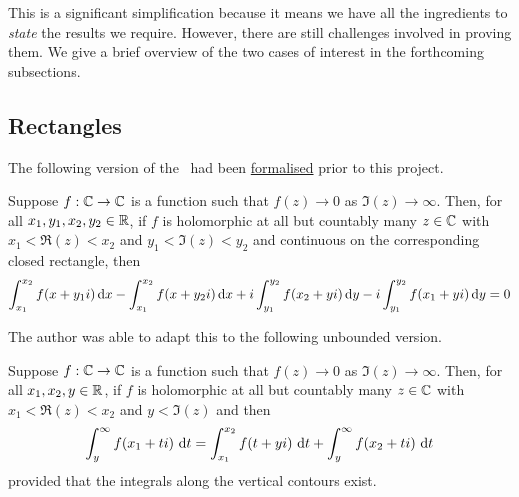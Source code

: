 This is a significant simplification because it means we have all the ingredients to \textit{state} the results we require. However, there are still challenges involved in proving them. We give a brief overview of the two cases of interest in the forthcoming subsections.

\subsection{Rectangles}

The following version of the \CGT\ had been \href{https://github.com/leanprover-community/mathlib4/blob/c38c7fde32656c7fa1b2471ed1ae0d50a600f089/Mathlib/Analysis/Complex/CauchyIntegral.lean#L241-L255}{formalised} prior to this project.

\begin{boxtheorem}\label{Ch5:Thm:CauchyGoursat_Bounded_on_off_Countable}
    Suppose $f : \mathbb{C} \to \mathbb{C}$ is a function such that $f(z) \to 0$ as $\Im(z) \to \infty$. Then, for all $x_1, y_1, x_2, y_2 \in \mathbb{R}$, if $f$ is holomorphic at all but countably many $z \in \mathbb{C}$ with $x_1 < \Re(z) < x_2$ and $y_1 < \Im(z) < y_2$ and continuous on the corresponding closed rectangle, then
    \begin{align*}
        \int_{x_1}^{x_2} f\of{x + y_1 i} \diff{x}
        - \int_{x_1}^{x_2} f\of{x + y_2 i} \diff{x}
        + i\int_{y_1}^{y_2} f\of{x_2 + yi} \diff{y}
        - i\int_{y_1}^{y_2} f\of{x_1 + yi} \diff{y} = 0
    \end{align*}
\end{boxtheorem}

The author was able to adapt this to the following unbounded version.

\begin{boxtheorem}\label{Ch5:Thm:CauchyGoursat_Unbounded_on_off_Countable}
    Suppose $f : \mathbb{C} \to \mathbb{C}$ is a function such that $f(z) \to 0$ as $\Im(z) \to \infty$. Then, for all $x_1, x_2, y \in \mathbb{R}$, if $f$ is holomorphic at all but countably many $z \in \mathbb{C}$ with $x_1 < \Re(z) < x_2$ and $y < \Im(z)$ and then
    \begin{align*}
        \int_{y}^{\infty} f\!\left( x_1 + ti \right) \, \operatorname{d}\!{t}
        = \int_{x_1}^{x_2} f\!\left( t + yi \right) \, \operatorname{d}\!{t}
        + \int_{y}^{\infty} f\!\left( x_2 + ti \right) \, \operatorname{d}\!{t}
    \end{align*}
    provided that the integrals along the vertical contours exist.
\end{boxtheorem}

